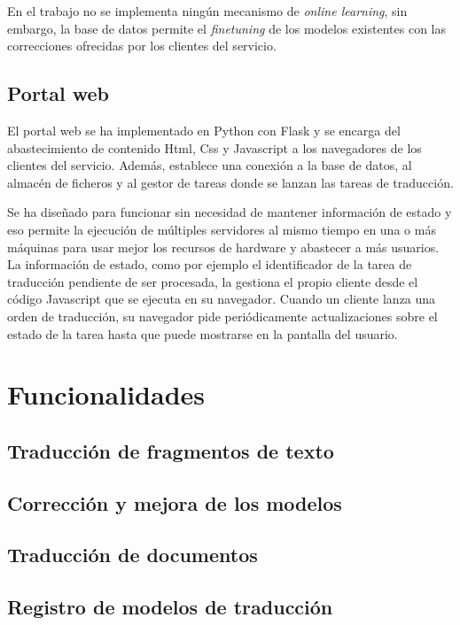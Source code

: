 En el trabajo no se implementa ningún mecanismo de \textit{online learning}, sin embargo, la base de datos permite el \textit{finetuning} de los modelos existentes con las correcciones ofrecidas por los clientes del servicio.

\subsection{Portal web}
El portal web se ha implementado en Python con Flask y se encarga del abastecimiento de contenido Html, Css y Javascript a los navegadores de los clientes del servicio. Además, establece una conexión a la base de datos, al almacén de ficheros y al gestor de tareas donde se lanzan las tareas de traducción.

Se ha diseñado para funcionar sin necesidad de mantener información de estado y eso permite la ejecución de múltiples servidores al mismo tiempo en una o más máquinas para usar mejor los recursos de hardware y abastecer a más usuarios. La información de estado, como por ejemplo el identificador de la tarea de traducción pendiente de ser procesada, la gestiona el propio cliente desde el código Javascript que se ejecuta en su navegador. Cuando un cliente lanza una orden de traducción, su navegador pide periódicamente actualizaciones sobre el estado de la tarea hasta que puede mostrarse en la pantalla del usuario.

\section{Funcionalidades}
\subsection{Traducción de fragmentos de texto}
\subsection{Corrección y mejora de los modelos}
\subsection{Traducción de documentos}
\subsection{Registro de modelos de traducción}
